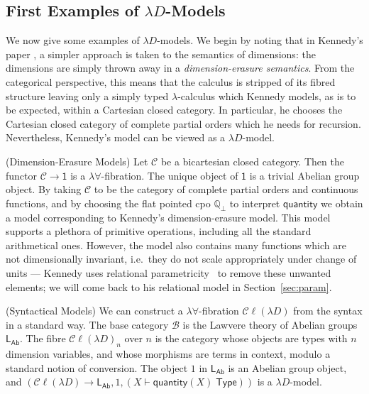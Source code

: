 \documentclass[a4paper,UKenglish]{lipics}
\theoremstyle{plain}
\newcommand{\ra}{\rightarrow}
\newcommand{\msf}[1]{\mathsf{#1}} %
\newcommand{\LAb}{\msf{L}_{\msf{Ab}}}
\newcommand{\terminal}{\msf{1}}
\newcommand{\ClLD}{\mathcal{C\ell}(\lambda{}D)} %
\newcommand{\B}{\mathcal{B}}
\newcommand{\C}{\mathcal{C}}
\newcommand{\bbQ}{\mathbb{Q}}
\newcommand{\qnt}{\msf{quantity}}
\newcommand{\Tj}[2]{#1 \vdash #2 \; \msf{ Type}}
\begin{document}
\subsection{First Examples of \texorpdfstring{$\lambda D$}{lambdaD}-Models}
We now give some examples of $\lambda D$-models. We begin by noting
that in Kennedy's paper \cite{Kennedy:1997:RPU:263699.263761}, a
simpler approach is taken to the semantics of dimensions: the
dimensions are simply thrown away in a {\em dimension-erasure
  semantics}. From the categorical perspective, this means that the
calculus is stripped of its fibred structure leaving only a simply
typed $\lambda$-calculus which Kennedy models, as is to be expected,
within a Cartesian closed category. In particular, he chooses the
Cartesian closed category of complete partial orders which he needs
for recursion. Nevertheless, Kennedy's model can be viewed as a
$\lambda D$-model.


\begin{example}(Dimension-Erasure Models)
\label{ex:UnitErasure}
Let $\C$ be a bicartesian closed category. Then the functor $\C \ra
\terminal$ is a $\lambda\forall$-fibration. The unique object of
$\terminal$ is a trivial Abelian group object. By taking $\C$ to be
the category of complete partial orders and continuous functions, and
by choosing the flat pointed cpo $\bbQ_{\bot}$ to interpret $\qnt$ we
obtain a model corresponding to Kennedy's dimension-erasure
model. This model supports a plethora of primitive operations,
including all the standard arithmetical ones. However, the model also
contains many functions which are not dimensionally invariant, i.e.\
they do not scale appropriately under change of units --- Kennedy uses
relational parametricity~\cite{reynolds1983types} to remove these
unwanted elements; we will come back to his relational model in
Section~\ref{sec:param}.
\end{example}


\begin{example}(Syntactical Models)
We can construct a $\lambda \forall$-fibration $\ClLD$ from the syntax in a standard way. The base category $\B$ is the Lawvere theory of Abelian groups $\LAb$. The fibre $\ClLD_n$ over $n$ is the category whose objects are types with $n$ dimension variables, and whose morphisms are terms in context, modulo a standard notion of conversion. The object $1$ in $\LAb$ is an Abelian group object, and $(\ClLD\to\LAb,1,(\Tj X{\qnt(X)}))$ is a $\lambda D$-model.
\end{example}
\end{document}
